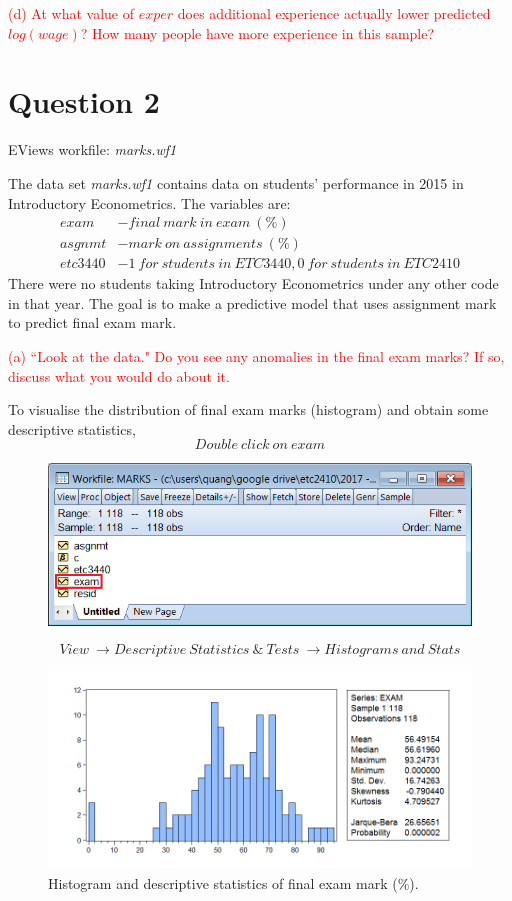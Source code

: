 \documentclass[12pt]{report}
\begin{document}
\vspace{40mm}

\noindent \textcolor{red}{(d) At what value of $exper$ does additional experience actually lower predicted $log(wage)$? How many people have more experience in this sample?}


\newpage
\section*{Question 2}
\noindent EViews workfile: \textit{marks.wf1}

\noindent The data set \textit{marks.wf1} contains data on students’ performance in 2015 in Introductory Econometrics. The variables are:
\begin{align*}
	exam &- final\ mark\ in\ exam\ (\%) \\
	asgnmt &- mark\ on\ assignments\ (\%) \\
	etc3440 &- 1\ for\ students\ in\ ETC3440, 0\ for\ students\ in\ ETC2410
\end{align*}
\noindent There were no students taking Introductory Econometrics under any other code in that year. The goal is to make a predictive model that uses assignment mark to predict final exam mark.

\noindent \textcolor{red}{(a) ``Look at the data." Do you see any anomalies in the final exam marks? If so, discuss what you would do about it.}

\noindent To visualise the distribution of final exam marks (histogram) and obtain some descriptive statistics,
$$Double\ click\ on\ exam$$
\begin{figure}[H]
	\centering
	\includegraphics{q1_1}
\end{figure}
\vspace{-\baselineskip}
$$View\ \to Descriptive\ Statistics\ \&\ Tests\ \to Histograms\ and\ Stats$$
\begin{figure}[H]
	\centerline{\includegraphics{q1_2}}
	\caption{Histogram and descriptive statistics of final exam mark (\%).}
\end{figure}
\vspace{-\baselineskip}
\end{document}
